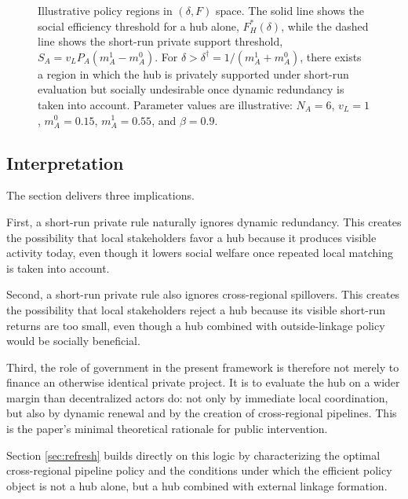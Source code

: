 \begin{figure}[htbp]
\caption{Illustrative policy regions in $(\delta,F)$ space. The solid line shows the social efficiency threshold for a hub alone, $F_H^*(\delta)$, while the dashed line shows the short-run private support threshold, $S_A=v_LP_A(m_A^1-m_A^0)$. For $\delta>\delta^{\dagger}=1/(m_A^1+m_A^0)$, there exists a region in which the hub is privately supported under short-run evaluation but socially undesirable once dynamic redundancy is taken into account. Parameter values are illustrative: $N_A=6$, $v_L=1$, $m_A^0=0.15$, $m_A^1=0.55$, and $\beta=0.9$.}
\label{fig:delta_F_regions}
\end{figure}

\subsection{Interpretation}

The section delivers three implications.

First, a short-run private rule naturally ignores dynamic redundancy. This creates the possibility that local stakeholders favor a hub because it produces visible activity today, even though it lowers social welfare once repeated local matching is taken into account.

Second, a short-run private rule also ignores cross-regional spillovers. This creates the possibility that local stakeholders reject a hub because its visible short-run returns are too small, even though a hub combined with outside-linkage policy would be socially beneficial.

Third, the role of government in the present framework is therefore not merely to finance an otherwise identical private project. It is to evaluate the hub on a wider margin than decentralized actors do: not only by immediate local coordination, but also by dynamic renewal and by the creation of cross-regional pipelines. This is the paper's minimal theoretical rationale for public intervention.

Section \ref{sec:refresh} builds directly on this logic by characterizing the optimal cross-regional pipeline policy and the conditions under which the efficient policy object is not a hub alone, but a hub combined with external linkage formation.
